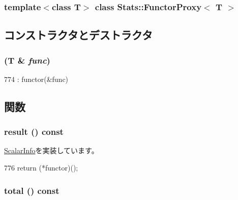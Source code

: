 \subsubsection*{template$<$class T$>$ class Stats::FunctorProxy$<$ T $>$}



\subsection{コンストラクタとデストラクタ}
\hypertarget{classStats_1_1FunctorProxy_a97d355488c67286f64a92cf2cfacabc2}{
\subsubsection[{FunctorProxy}]{ (T \& {\em func})}}
\label{classStats_1_1FunctorProxy_a97d355488c67286f64a92cf2cfacabc2}



\begin{DoxyCode}
774 : functor(&func) {}
\end{DoxyCode}


\subsection{関数}
\hypertarget{classStats_1_1FunctorProxy_ae050da86c3d8e8a677a0bdeb7971e1e3}{
\subsubsection[{result}]{ result () const}}
\label{classStats_1_1FunctorProxy_ae050da86c3d8e8a677a0bdeb7971e1e3}


\hyperlink{classStats_1_1ScalarInfo_a8c2a750792392eea5225b05b9ec4bead}{ScalarInfo}を実装しています。


\begin{DoxyCode}
776 { return (*functor)(); }
\end{DoxyCode}
\hypertarget{classStats_1_1FunctorProxy_a35c6e2ed3fc81b40d69052a062113ead}{
\subsubsection[{total}]{ total () const}}
\label{classStats_1_1FunctorProxy_a35c6e2ed3fc81b40d69052a062113ead}


